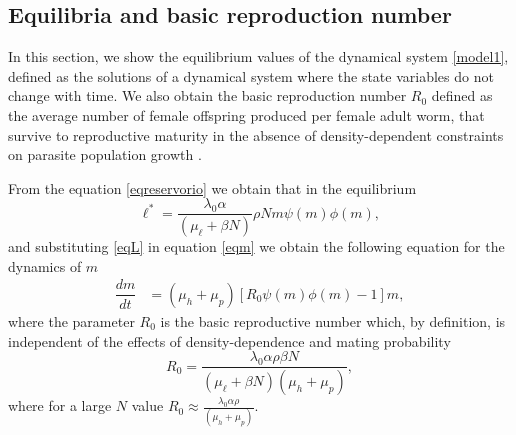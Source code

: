 \documentclass[eng]{MMSB-class-eng}
\begin{document}
\subsection{Equilibria and basic reproduction number}
{\color{red}
In this section, we show the equilibrium values of the dynamical system \eqref{model1}, 
defined as the solutions of a dynamical system where the state variables do not change with time.  
We also obtain the basic reproduction number $R_0$ defined as 
the average number of female offspring produced per female adult worm, that survive to reproductive maturity in the
absence of density-dependent constraints on parasite population growth \citep{anderson1992infectious}.



From the equation \eqref{eqreservorio} we obtain that in the equilibrium
\begin{equation}\label{eqL}
\ell^*=\frac{ \lambda_0 \alpha}{(\mu_{\ell}+\beta N)} \rho N m \psi(m)\phi(m), 
\end{equation} 
and substituting \eqref{eqL} in equation \eqref{eqm} we obtain the following equation for the dynamics of $m$
\begin{align}\label{eqMR0}
\dfrac{dm}{dt}&=(\mu_h + \mu_p)\left[ R_0  \psi(m)\phi(m) -1 \right] m,%
\end{align}
where the parameter $R_0$ is the basic reproductive number which, by definition, is independent of the effects of density-dependence and  mating probability
\begin{equation}\label{valorR0}
R_0=\frac{ \lambda_0 \alpha  \rho \beta N}{ (\mu_{\ell}+\beta N) (\mu_h + \mu_p) },
\end{equation}
where for a large $N$ value $R_0\approx \frac{ \lambda_0 \alpha  \rho }{ (\mu_h + \mu_p) }$. 

}
\end{document}
